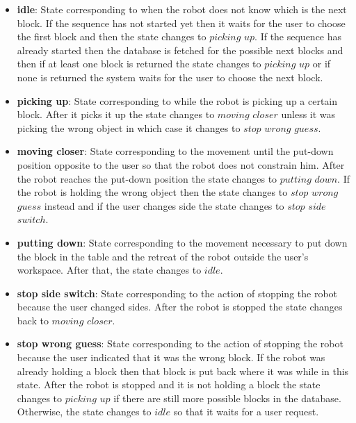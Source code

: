 \begin{itemize}
    \item \textbf{idle}: State corresponding to when the robot does not know which is the next block. If the sequence has not started yet then it waits for the user to choose the first block and then the state changes to $picking$ $up$. If the sequence has already started then the database is fetched for the possible next blocks and then if at least one block is returned the state changes to $picking$ $up$ or if none is returned the system waits for the user to choose the next block.
    \item \textbf{picking up}: State corresponding to while the robot is picking up a certain block. After it picks it up the state changes to $moving$ $closer$ unless it was picking the wrong object in which case it changes to $stop$ $wrong$ $guess$.
    \item \textbf{moving closer}: State corresponding to the movement until the put-down position opposite to the user so that the robot does not constrain him. After the robot reaches the put-down position the state changes to $putting$ $down$. If the robot is holding the wrong object then the state changes to $stop$ $wrong$ $guess$ instead and if the user changes side the state changes to $stop$ $side$ $switch$.
    \item \textbf{putting down}: State corresponding to the movement necessary to put down the block in the table and the retreat of the robot outside the user's workspace. After that, the state changes to $idle$.
    \item \textbf{stop side switch}: State corresponding to the action of stopping the robot because the user changed sides. After the robot is stopped the state changes back to $moving$ $closer$.
    \item \textbf{stop wrong guess}: State corresponding to the action of stopping the robot because the user indicated that it was the wrong block. If the robot was already holding a block then that block is put back where it was while in this state. After the robot is stopped and it is not holding a block the state changes to $picking$ $up$ if there are still more possible blocks in the database. Otherwise, the state changes to $idle$ so that it waits for a user request.
\end{itemize}

